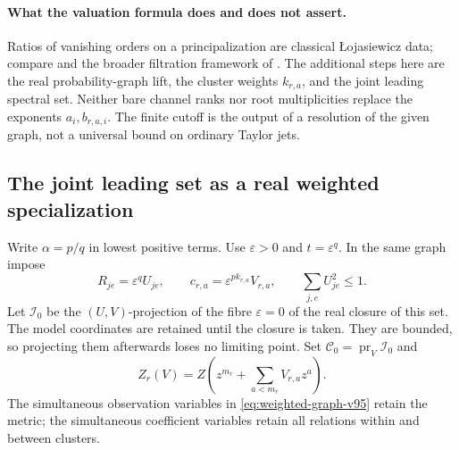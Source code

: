 \paragraph{What the valuation formula does and does not assert.}
Ratios of vanishing orders on a principalization are classical
\L{}ojasiewicz data; compare \cite[Proposition 4.3 and Theorem 4.8]{v95BE09}
and the broader filtration framework of \cite{v95Ha26}. The additional
steps here are the real probability-graph lift, the cluster weights
$k_{r,a}$, and the joint leading spectral set. Neither bare channel ranks
nor root multiplicities replace the exponents $a_i,b_{r,a,i}$. The
finite cutoff is the output of a resolution of the given graph, not a
universal bound on ordinary Taylor jets.

\subsection{The joint leading set as a real weighted specialization}
Write $\alpha=p/q$ in lowest positive terms. Use $\varepsilon>0$ and
$t=\varepsilon^q$. In the same graph impose
\begin{equation}\label{eq:weighted-graph-v95}
 R_{je}=\varepsilon^q U_{je},\qquad
 c_{r,a}=\varepsilon^{p k_{r,a}}V_{r,a},\qquad
 \sum_{j,e}U_{je}^2\le1.
\end{equation}
Let $\mathscr I_0$ be the $(U,V)$-projection of the fibre
$\varepsilon=0$ of the real closure of this set. The model coordinates
are retained until the closure is taken. They are bounded, so projecting
them afterwards loses no limiting point. Set
$\mathscr C_0=\operatorname{pr}_V\mathscr I_0$ and
\[
 Z_r(V)=Z\left(z^{m_r}+\sum_{a<m_r}V_{r,a}z^a\right).
\]
The simultaneous observation variables in \eqref{eq:weighted-graph-v95}
retain the metric; the simultaneous coefficient variables retain all
relations within and between clusters.

